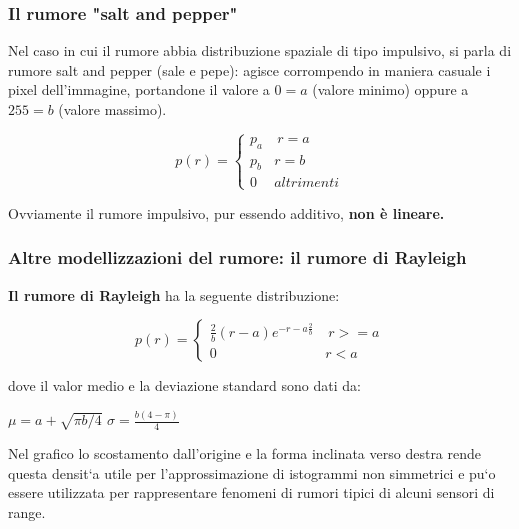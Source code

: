 
\subsubsection{Il rumore "salt and pepper"}
Nel caso in cui il rumore abbia distribuzione spaziale di tipo impulsivo, si parla di rumore salt and pepper (sale e pepe): agisce
corrompendo in maniera casuale i pixel dell’immagine, portandone il valore a $0=a$ (valore minimo) oppure a $255=b$ (valore massimo).
\begin{center}
    $$
        p(r) = \left\{ \begin{array}{cl}
            p_a & \ r = a    \\
            p_b & r = b      \\
            0   & altrimenti
        \end{array} \right.
    $$
\end{center}
Ovviamente il rumore impulsivo, pur essendo additivo, \textbf{non è
    lineare.}


\subsubsection{Altre modellizzazioni del rumore: il rumore di Rayleigh}
\textbf{Il rumore di Rayleigh} ha la seguente distribuzione:

\begin{center}
    $$
        p(r) = \left\{ \begin{array}{cl}
            \frac{2}{b}(r-a)e^{-{r-a}\frac{2}{b}} & \ r >= a \\
            0                                     & r<a
        \end{array} \right.
    $$
\end{center}

dove il valor medio e la deviazione standard sono dati da:

\begin{center}
    $\mu = a + \sqrt{\pi b/4}$ $\sigma = \frac{b(4-\pi)}{4}$
\end{center}

Nel grafico lo scostamento dall’origine e la forma inclinata verso
destra rende questa densit`a utile per l’approssimazione di
istogrammi non simmetrici e pu`o essere utilizzata per rappresentare
fenomeni di rumori tipici di alcuni sensori di range.


